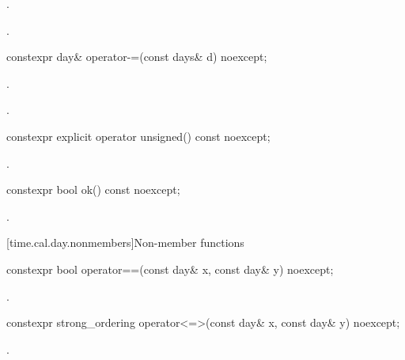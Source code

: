 \begin{itemdescr}
\pnum
\effects
{}.

\pnum
\returns
{}.
\end{itemdescr}

%
\begin{itemdecl}
constexpr day& operator-=(const days& d) noexcept;
\end{itemdecl}

\begin{itemdescr}
\pnum
\effects
{}.

\pnum
\returns
{}.
\end{itemdescr}

%
\begin{itemdecl}
constexpr explicit operator unsigned() const noexcept;
\end{itemdecl}

\begin{itemdescr}
\pnum
\returns
{}.
\end{itemdescr}

%
\begin{itemdecl}
constexpr bool ok() const noexcept;
\end{itemdecl}

\begin{itemdescr}
\pnum
\returns
{}.
\end{itemdescr}

[time.cal.day.nonmembers]{Non-member functions}

%
\begin{itemdecl}
constexpr bool operator==(const day& x, const day& y) noexcept;
\end{itemdecl}

\begin{itemdescr}
\pnum
\returns
{}.
\end{itemdescr}

%
\begin{itemdecl}
constexpr strong_ordering operator<=>(const day& x, const day& y) noexcept;
\end{itemdecl}

\begin{itemdescr}
\pnum
\returns
{}.
\end{itemdescr}

